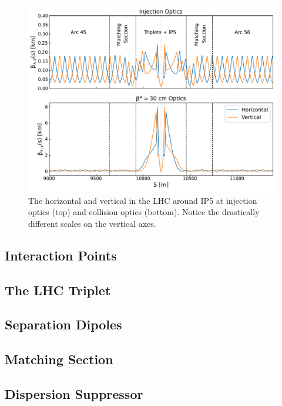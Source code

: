 \begin{figure}[h]
  \centering
  \includegraphics*[width=0.9\linewidth]{Figures/Chapter3/ir5_surroundings_optics_2.pdf}
  \caption{The horizontal and vertical \betafunctions in the LHC around IP5 at injection optics (top) and collision optics (bottom). Notice the drastically different scales on the vertical axes.}
  \label{figure:ir5_and_around}
\end{figure}

\subsection{Interaction Points}
\label{subsection:interaction_points}

\subsection{The LHC Triplet}
\label{subsection:lhc_triplet}

\subsection{Separation Dipoles}
\label{subsection:separation_dipoles}

\subsection{Matching Section}
\label{subsection:matching_section}

\subsection{Dispersion Suppressor}
\label{subsection:dispersion_suppressor}

